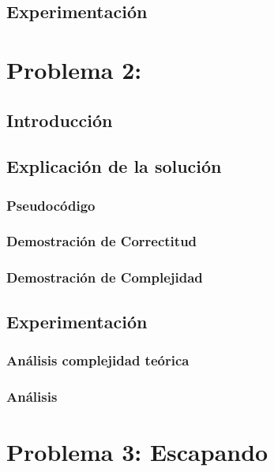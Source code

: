 \documentclass[spanish,12pt]{article}
\begin{document}
\subsection{Experimentación}


\section{Problema 2: }

\subsection{Introducción}


\subsection{Explicación de la solución}



\subsubsection{Pseudocódigo}


\subsubsection{Demostración de Correctitud}


\subsubsection{Demostración de Complejidad}


\subsection{Experimentación}


\subsubsection{Análisis complejidad te\'orica}


\subsubsection{Análisis}



\section{Problema 3: Escapando}
\end{document}
